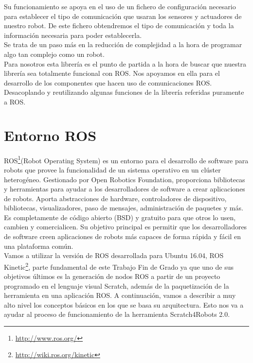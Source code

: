 Su funcionamiento se apoya en el uso de un fichero de configuración necesario para establecer el tipo de comunicación que usaran los sensores y actuadores de nuestro robot. De este fichero obtendremos el tipo de comunicación y toda la información necesaria para poder establecerla. \\

Se trata de un paso más en la reducción de complejidad a la hora de programar algo tan complejo como un robot.\\

Para nosotros esta librería es el punto de partida a la hora de buscar que nuestra librería sea totalmente funcional con ROS. Nos apoyamos en ella para el desarrollo de los componentes que hacen uso de comunicaciones ROS. Desacoplando y reutilizando algunas funciones de la librería referidas puramente a ROS.


\section{Entorno ROS}
\label{sec:ros}
ROS\footnote{\url{http://www.ros.org/}}(Robot Operating System) es un entorno para el desarrollo de software para robots que provee la funcionalidad de un sistema operativo en un clúster heterogéneo. Gestionado por Open Robotics Foundation, proporciona bibliotecas y herramientas para ayudar a los desarrolladores de software a crear aplicaciones de robots. Aporta abstracciones de hardware, controladores de dispositivo, bibliotecas, visualizadores, paso de mensajes, administración de paquetes y más.\\

Es completamente de código abierto (BSD) y gratuito para que otros lo usen, cambien y comercialicen. Su objetivo principal es permitir que los desarrolladores de software creen aplicaciones de robots más capaces de forma rápida y fácil en una plataforma común. \\

Vamos a utilizar la versión de ROS desarrollada para Ubuntu 16.04, ROS Kinetic\footnote{\url{http://wiki.ros.org/kinetic}}, parte fundamental de este Trabajo Fin de Grado ya que uno de sus objetivos últimos es la generación de nodos ROS a partir de un proyecto programado en el lenguaje visual Scratch, además de la paquetización de la herramienta en una aplicación ROS. A continuación, vamos a describir a muy alto nivel los conceptos básicos en los que se basa su arquitectura. Esto nos va a ayudar al proceso de funcionamiento de la herramienta Scratch4Robots 2.0.\\


